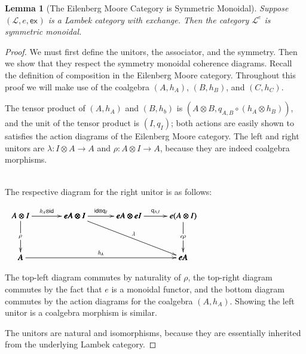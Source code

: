 \documentclass{article}
\newtheorem{lemma}[theorem]{Lemma}
\let\mto\to
\let\to\relax
\newcommand{\to}{\rightarrow}
\newcommand{\cat}[1]{\mathcal{#1}}
\newcommand{\id}[0]{\mathsf{id}}
\newcommand{\e}[1]{\mathsf{ex}_{#1}}
\newcommand{\q}[1]{\mathsf{q}_{#1}}
\begin{document}
\begin{lemma}[The Eilenberg Moore Category is Symmetric Monoidal]
  \label{lemma:the_eilenberg_moore_category_is_symmetric_monoidal}
  Suppose $(\cat{L},e,\e{})$ is a Lambek category with exchange.  Then
  the category $\cat{L}^e$ is symmetric monoidal.
\end{lemma}
\begin{proof}
  We must first define the unitors, the associator, and the symmetry.
  Then we show that they respect the symmetry monoidal coherence
  diagrams.  Recall the definition of composition in the Eilenberg
  Moore category.  Throughout this proof we will make use of the
  coalgebra $(A,h_A)$, $(B,h_B)$, and $(C,h_C)$. 

  The tensor product of $(A, h_A)$ and $(B, h_b)$ is $(A \otimes
  B,q_{A,B} \circ (h_A \otimes h_B))$, and the unit of the tensor
  product is $(I, q_I)$; both actions are easily shown to satisfies
  the action diagrams of the Eilenberg Moore category. The left and
  right unitors are $\lambda : I \otimes A \mto A$ and $\rho : A
  \otimes I \mto A$, because they are indeed coalgebra morphisms.

  \ \\
  \noindent
  The respective diagram for the right unitor is as follows:
  \begin{center}
    \begin{math}
      \begin{array}{lll}
        \bfig
        \square|amma|/->`->``/<650,500>[A \otimes I`eA \otimes I`A`;h_A \otimes \id{}`\rho``]
        \morphism(650,500)<650,0>[eA \otimes I`eA \otimes eI;\id{} \otimes \q{I}]
        \square(1300,0)|amma|/->``->`/<650,500>[eA \otimes eI`e(A \otimes I)``eA;\q{A,I}``e\rho`]

        \morphism(650,500)<1300,-500>[eA \otimes I`eA;\lambda]
        \morphism<1950,0>[A`eA;h_A]
        \efig
      \end{array}
    \end{math}
  \end{center}
  The top-left diagram commutes by naturality of $\rho$, the top-right
  diagram commutes by the fact that $e$ is a monoidal functor, and the
  bottom diagram commutes by the action diagrams for the coalgebra
  $(A,h_A)$. Showing the left unitor is a coalgebra morphism is
  similar.

  The unitors are natural and isomorphisms, because they are
  essentially inherited from the underlying Lambek category.


\end{proof}
\end{document}
